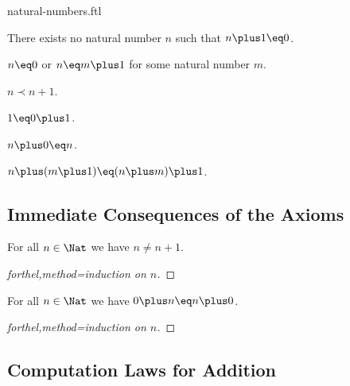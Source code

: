 \documentclass{naproche-library}
\begin{document}
\begin{smodule}{natural-numbers.ftl}
  \begin{axiom}[forthel,id=ZeroIsNoSuccessorAx]
    There exists no natural number $n$ such that $n\plus1\eq0$.
  \end{axiom}

  \begin{axiom}[forthel,id=NatNumberIsZeroOrSuccessorAx]
    $n\eq0$ or $n\eq m\plus1$ for some natural number $m$.
  \end{axiom}

  \begin{axiom}[forthel,title=Induction,id=InductionAx]
    $n\prec n\plus1$.
  \end{axiom}

  \begin{axiom}[forthel,id=OneIsSuccessorOfZeroAx]
    $1\eq0\plus1$.
  \end{axiom}

  \begin{axiom}[forthel,id=AdditionWithZeroAx]
    $n\plus0\eq n$.
  \end{axiom}

  \begin{axiom}[forthel,id=AdditionWithSuccessorAx]
    $n\plus(m\plus1)\eq(n\plus m)\plus1$.
  \end{axiom}


  \subsection{Immediate Consequences of the Axioms}

  \begin{proposition}[forthel,id=NatNumberIsNotItsOwnSuccessorProp]
    For all $n\in\Nat$ we have $n\neq n\plus1$.
  \end{proposition}
  \begin{proof}[forthel,method=induction on $n$]\end{proof}

  \begin{proposition}[forthel,id=PlusCommutesWithZeroProp]
    For all $n\in\Nat$ we have $0\plus n\eq n\plus0$.
  \end{proposition}
  \begin{proof}[forthel,method=induction on $n$]\end{proof}


  \subsection{Computation Laws for Addition}


\end{smodule}
\end{document}
